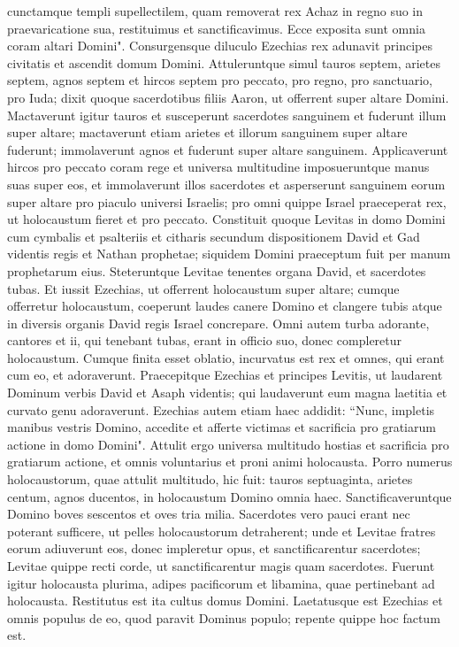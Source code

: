 \begin{biblechapter}
\verse cunctamque templi supellectilem, quam removerat rex Achaz in regno suo in praevaricatione sua, restituimus et sanctificavimus. Ecce exposita sunt omnia coram altari Domini". 
\verse Consurgensque diluculo Ezechias rex adunavit principes civitatis et ascendit domum Domini. 
\verse Attuleruntque simul tauros septem, arietes septem, agnos septem et hircos septem pro peccato, pro regno, pro sanctuario, pro Iuda; dixit quoque sacerdotibus filiis Aaron, ut offerrent super altare Domini. 
\verse Mactaverunt igitur tauros et susceperunt sacerdotes sanguinem et fuderunt illum super altare; mactaverunt etiam arietes et illorum sanguinem super altare fuderunt; immolaverunt agnos et fuderunt super altare sanguinem. 
\verse Applicaverunt hircos pro peccato coram rege et universa multitudine imposueruntque manus suas super eos, 
\verse et immolaverunt illos sacerdotes et asperserunt sanguinem eorum super altare pro piaculo universi Israelis; pro omni quippe Israel praeceperat rex, ut holocaustum fieret et pro peccato. 
\verse Constituit quoque Levitas in domo Domini cum cymbalis et psalteriis et citharis secundum dispositionem David et Gad videntis regis et Nathan prophetae; siquidem Domini praeceptum fuit per manum prophetarum eius. 
\verse Steteruntque Levitae tenentes organa David, et sacerdotes tubas. 
\verse Et iussit Ezechias, ut offerrent holocaustum super altare; cumque offerretur holocaustum, coeperunt laudes canere Domino et clangere tubis atque in diversis organis David regis Israel concrepare. 
\verse Omni autem turba adorante, cantores et ii, qui tenebant tubas, erant in officio suo, donec compleretur holocaustum. 
\verse Cumque finita esset oblatio, incurvatus est rex et omnes, qui erant cum eo, et adoraverunt. 
\verse Praecepitque Ezechias et principes Levitis, ut laudarent Dominum verbis David et Asaph videntis; qui laudaverunt eum magna laetitia et curvato genu adoraverunt. 
\verse Ezechias autem etiam haec addidit: “Nunc, impletis manibus vestris Domino, accedite et afferte victimas et sacrificia pro gratiarum actione in domo Domini". Attulit ergo universa multitudo hostias et sacrificia pro gratiarum actione, et omnis voluntarius et proni animi holocausta. 
\verse Porro numerus holocaustorum, quae attulit multitudo, hic fuit: tauros septuaginta, arietes centum, agnos ducentos, in holocaustum Domino omnia haec. 
\verse Sanctificaveruntque Domino boves sescentos et oves tria milia. 
\verse Sacerdotes vero pauci erant nec poterant sufficere, ut pelles holocaustorum detraherent; unde et Levitae fratres eorum adiuverunt eos, donec impleretur opus, et sanctificarentur sacerdotes; Levitae quippe recti corde, ut sanctificarentur magis quam sacerdotes. 
\verse Fuerunt igitur holocausta plurima, adipes pacificorum et libamina, quae pertinebant ad holocausta. Restitutus est ita cultus domus Domini. 
\verse Laetatusque est Ezechias et omnis populus de eo, quod paravit Dominus populo; repente quippe hoc factum est. 
\end{biblechapter}

